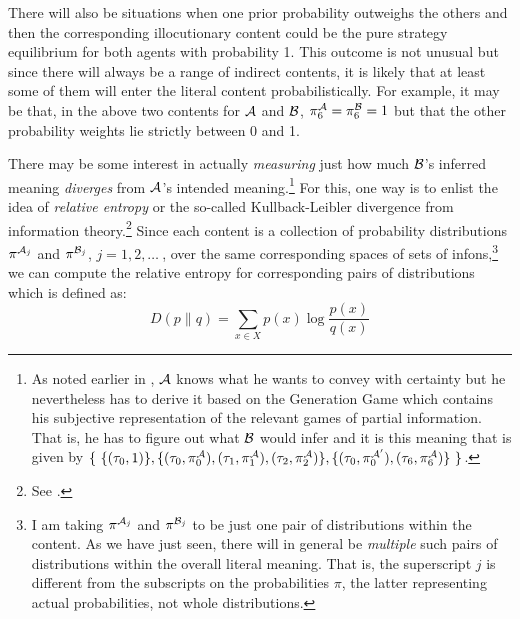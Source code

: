 

There will also be situations when one prior probability outweighs the others and then the corresponding illocutionary content could be the pure strategy equilibrium for both agents with probability 1. This outcome is not unusual but since there will always be a range of indirect contents, it is likely that at least some of them will enter the literal content probabilistically. For example, it may be that, in the above two contents for $\cal A$ and $\cal B$, $\pi^{\cal A}_6 = \pi^{\cal B}_6 = 1$ but that the other probability weights lie strictly between 0 and 1.

There may be some interest in actually \emph{measuring} just how much $\cal B$'s inferred meaning \emph{diverges} from $\cal A$'s intended meaning.\footnote{As noted earlier in , $\cal A$ knows what he wants to convey with certainty but he nevertheless has to derive it based on the Generation Game which contains his subjective representation of the relevant games of partial information. That is, he has to figure out what $\cal B$ would infer and it is this meaning that is given by $\{\ \{(\tau_0, 1)\},\allowbreak \{(\tau_0, \pi^{\cal A}_0), (\tau_1, \pi^{\cal A}_1), (\tau_2, \pi^{\cal A}_2)\},\allowbreak \{(\tau_0, \pi^{{\cal A}'}_0), (\tau_6, \pi^{\cal A}_6)\}\ \}$.} For this, one way is to enlist the idea of \emph{relative entropy} or the so-called Kullback-Leibler divergence from information theory.\footnote{See \citet[72]{ms:fsnlp}.} Since each content is a collection of probability distributions $\pi^{{\cal A}_j}$ and $\pi^{{\cal B}_j}$, $j = 1, 2, \ldots\ $, over the same corresponding spaces of sets of infons,\footnote{I am taking $\pi^{{\cal A}_j}$ and $\pi^{{\cal B}_j}$ to be just one pair of distributions within the content. As we have just seen, there will in general be \emph{multiple} such pairs of distributions within the overall literal meaning. That is, the superscript $j$ is different from the subscripts on the probabilities $\pi$, the latter representing actual probabilities, not whole distributions.} we can compute the relative entropy for corresponding pairs of distributions which is defined as: \[ D(p \parallel q) = \sum_{x \in X} p(x) \log \frac{p(x)}{q(x)} \] 

